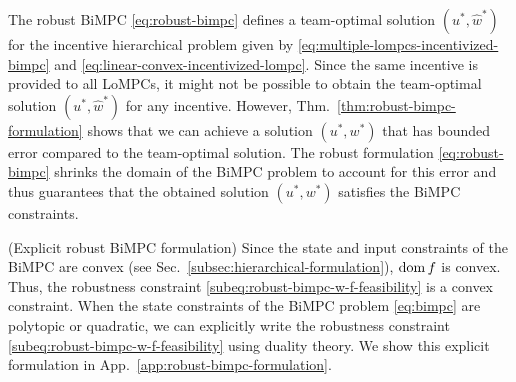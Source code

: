 The robust BiMPC \eqref{eq:robust-bimpc} defines a team-optimal solution $(u^*, \hat{w}^*)$ for the incentive hierarchical problem given by \eqref{eq:multiple-lompcs-incentivized-bimpc} and \eqref{eq:linear-convex-incentivized-lompc}.
Since the same incentive is provided to all LoMPCs, it might not be possible to obtain the team-optimal solution $(u^*, \hat{w}^*)$ for any incentive.
However, Thm.~\ref{thm:robust-bimpc-formulation} shows that we can achieve a solution $(u^*, w^*)$ that has bounded error compared to the team-optimal solution.
The robust formulation \eqref{eq:robust-bimpc} shrinks the domain of the BiMPC problem to account for this error and thus guarantees that the obtained solution $(u^*, w^*)$ satisfies the BiMPC constraints.


\begin{remark} (Explicit robust BiMPC formulation)
\label{rem:explicit-robust-bimpc-formulation}
Since the state and input constraints of the BiMPC are convex (see Sec.~\ref{subsec:hierarchical-formulation}), $\operatorname{dom}{f}$ is convex.
Thus, the robustness constraint \eqref{subeq:robust-bimpc-w-f-feasibility} is a convex constraint.
When the state constraints of the BiMPC problem \eqref{eq:bimpc} are polytopic or quadratic, we can explicitly write the robustness constraint \eqref{subeq:robust-bimpc-w-f-feasibility} using duality theory.
We show this explicit formulation in App.~\ref{app:robust-bimpc-formulation}.
\end{remark}

